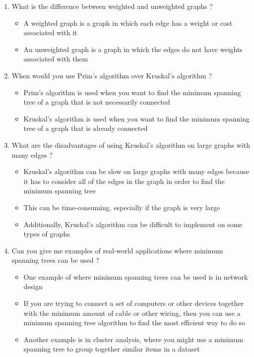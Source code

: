 \begin{enumerate}[label=\arabic*. ]
	\item What is the difference between weighted and unweighted graphs ?
	\answer
		\begin{itemize}[label=$\ast$]
			\item A weighted graph is a graph in which each edge has a weight or cost associated
				with it
			\item An unweighted graph is a graph in which the edges do not have weights associated
				with them
		\end{itemize}
	
	\item When would you use Prim's algorithm over Kruskal's algorithm ?
	\answer
		\begin{itemize}[label=$\ast$]
			\item Prim's algorithm is used when you want to find the minimum spanning tree of a
				graph that is not necessarily connected
			\item Kruskal's algorithm is used when you want to find the minimum spanning tree of a
				graph that is already connected
		\end{itemize}
	
	\item What are the disadvantages of using Kruskal's algorithm on large graphs with many edges ?
	\answer
		\begin{itemize}[label=$\ast$]
			\item Kruskal's algorithm can be slow on large graphs with many edges because it has to
				consider all of the edges in the graph in order to find the minimum spanning
				tree
			\item This can be time-consuming, especially if the graph is very large
			\item Additionally, Kruskal's algorithm can be difficult to implement on some types of
				graphs
		\end{itemize}
	
	\item Can you give me examples of real-world applications where minimum spanning trees can be used ?
	\answer
		\begin{itemize}[label=$\ast$]

			\item One example of where minimum spanning trees can be used is in network design
			\item If you are trying to connect a set of computers or other devices together with the
				minimum amount of cable or other wiring, then you can use a minimum spanning
				tree algorithm to find the most efficient way to do so
			\item Another example is in cluster analysis, where you might use a minimum spanning
				tree to group together similar items in a dataset
		\end{itemize}
\end{enumerate}
